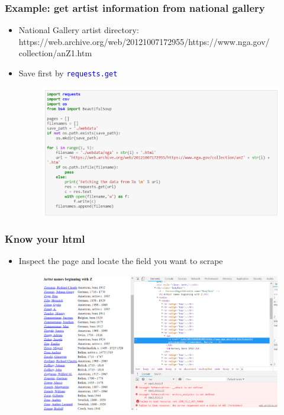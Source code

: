 \documentclass[red]{beamer}
\begin{document}
\begin{frame}
\frametitle{Example: get artist information from national gallery}
\begin{itemize}
	\item National Gallery artist directory: https://web.archive.org/web/20121007172955/https://www.nga.gov/
	collection/anZ1.htm
	\item Save first by \textcolor{blue}{\texttt{requests.get}}
	\begin{figure}
		\centering
		\includegraphics[width=1\linewidth]{figure/screenshot031}
	\end{figure}
\end{itemize}
\end{frame}

\begin{frame}
\frametitle{Know your html}
\begin{itemize}
	\item Inspect the page and locate the field you want to scrape
	\begin{figure}
		\centering
		\includegraphics[width=1\linewidth]{figure/screenshot032}
	\end{figure}
\end{itemize}
\end{frame}
\end{document}
